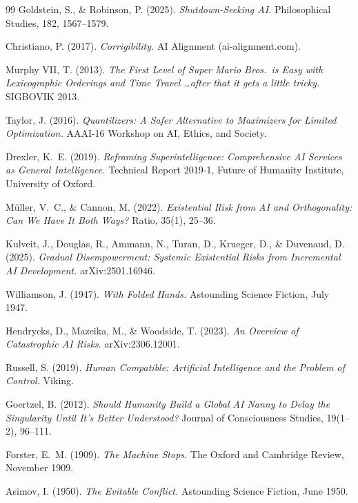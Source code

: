 \documentclass[11pt]{article}
\theoremstyle{definition}
\begin{document}
\begin{thebibliography}{99}
Goldstein, S., \& Robinson, P. (2025). \emph{Shutdown-Seeking AI.} Philosophical Studies, 182, 1567--1579.

Christiano, P. (2017). \emph{Corrigibility.} AI Alignment (ai-alignment.com).

Murphy VII, T. (2013). \emph{The First Level of Super Mario Bros.\ is Easy with Lexicographic Orderings and Time Travel \ldots after that it gets a little tricky.} SIGBOVIK 2013.

Taylor, J. (2016). \emph{Quantilizers: A Safer Alternative to Maximizers for Limited Optimization.} AAAI-16 Workshop on AI, Ethics, and Society.

Drexler, K.~E. (2019). \emph{Reframing Superintelligence: Comprehensive AI Services as General Intelligence.} Technical Report 2019-1, Future of Humanity Institute, University of Oxford.

M\"uller, V.~C., \& Cannon, M. (2022). \emph{Existential Risk from AI and Orthogonality: Can We Have It Both Ways?} Ratio, 35(1), 25--36.

Kulveit, J., Douglas, R., Ammann, N., Turan, D., Krueger, D., \& Duvenaud, D. (2025). \emph{Gradual Disempowerment: Systemic Existential Risks from Incremental AI Development.} arXiv:2501.16946.

Williamson, J. (1947). \emph{With Folded Hands.} Astounding Science Fiction, July 1947.

Hendrycks, D., Mazeika, M., \& Woodside, T. (2023). \emph{An Overview of Catastrophic AI Risks.} arXiv:2306.12001.

Russell, S. (2019). \emph{Human Compatible: Artificial Intelligence and the Problem of Control.} Viking.

Goertzel, B. (2012). \emph{Should Humanity Build a Global AI Nanny to Delay the Singularity Until It's Better Understood?} Journal of Consciousness Studies, 19(1--2), 96--111.

Forster, E.~M. (1909). \emph{The Machine Stops.} The Oxford and Cambridge Review, November 1909.

Asimov, I. (1950). \emph{The Evitable Conflict.} Astounding Science Fiction, June 1950.


\end{thebibliography}
\end{document}
